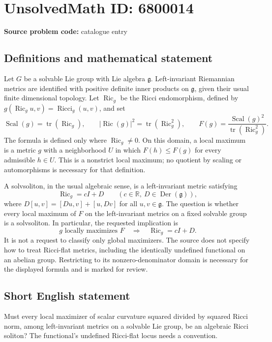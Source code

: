 \documentclass[11pt]{article}
\newcommand{\R}{\mathbb{R}}
\begin{document}
\section*{UnsolvedMath ID: 6800014}
\textbf{Source problem code:} catalogue entry
\subsection{Definitions and mathematical statement}
Let \(G\) be a solvable Lie group with Lie algebra \(\mathfrak g\). Left-invariant Riemannian metrics are identified with positive definite inner products on \(\mathfrak g\), given their usual finite dimensional topology. Let \(\operatorname{Ric}_g\) be the Ricci endomorphism, defined by \(g(\operatorname{Ric}_g u,v)=\operatorname{Ricci}_g(u,v)\), and set
\[
 \operatorname{Scal}(g)=\operatorname{tr}(\operatorname{Ric}_g),\qquad
 |\operatorname{Ric}(g)|^2=\operatorname{tr}(\operatorname{Ric}_g^2),\qquad
 F(g)=\frac{\operatorname{Scal}(g)^2}{\operatorname{tr}(\operatorname{Ric}_g^2)}.
\]
The formula is defined only where \(\operatorname{Ric}_g\ne0\). On this domain, a local maximum is a metric \(g\) with a neighborhood \(U\) in which \(F(h)\leq F(g)\) for every admissible \(h\in U\). This is a nonstrict local maximum; no quotient by scaling or automorphisms is necessary for that definition.

A solvsoliton, in the usual algebraic sense, is a left-invariant metric satisfying
\[
 \operatorname{Ric}_g=cI+D\qquad(c\in\R,\ D\in\operatorname{Der}(\mathfrak g)),
\]
where \(D[u,v]=[Du,v]+[u,Dv]\) for all \(u,v\in\mathfrak g\). The question is whether every local maximum of \(F\) on the left-invariant metrics on a fixed solvable group is a solvsoliton. In particular, the requested implication is
\[
 g\text{ locally maximizes }F\quad\Longrightarrow\quad
 \operatorname{Ric}_g=cI+D.
\]
It is not a request to classify only global maximizers. The source does not specify how to treat Ricci-flat metrics, including the identically undefined functional on an abelian group. Restricting to its nonzero-denominator domain is necessary for the displayed formula and is marked for review.
\subsection{Short English statement}
Must every local maximizer of scalar curvature squared divided by squared Ricci norm, among left-invariant metrics on a solvable Lie group, be an algebraic Ricci soliton? The functional's undefined Ricci-flat locus needs a convention.
\end{document}
